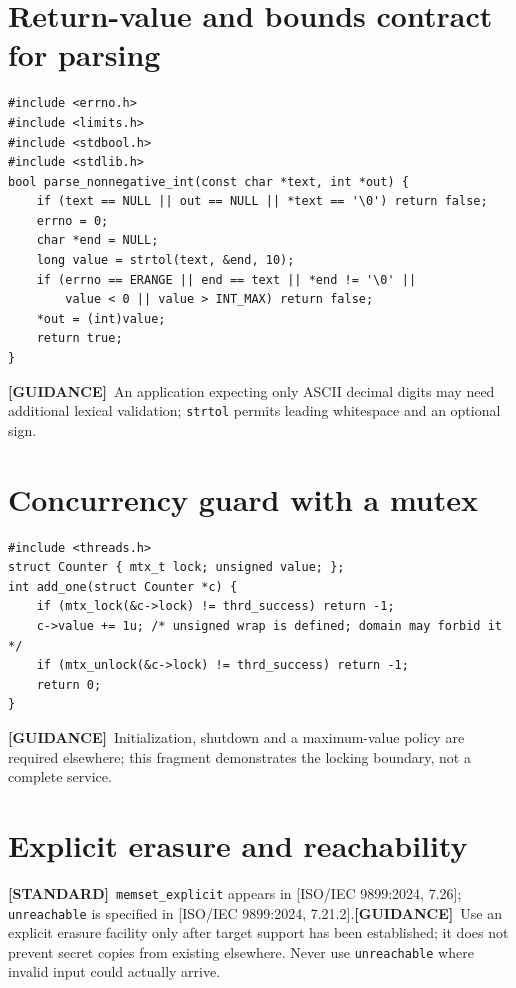 \documentclass[10pt,letterpaper,oneside]{report}
\newcommand{\refcl}[1]{\textsf{\footnotesize[ISO/IEC 9899:2024, #1]}}
\newcommand{\standard}{\textbf{[STANDARD]}}
\newcommand{\guidance}{\textbf{[GUIDANCE]}}
\begin{document}
\section{Return-value and bounds contract for parsing}
\begin{lstlisting}
#include <errno.h>
#include <limits.h>
#include <stdbool.h>
#include <stdlib.h>
bool parse_nonnegative_int(const char *text, int *out) {
    if (text == NULL || out == NULL || *text == '\0') return false;
    errno = 0;
    char *end = NULL;
    long value = strtol(text, &end, 10);
    if (errno == ERANGE || end == text || *end != '\0' ||
        value < 0 || value > INT_MAX) return false;
    *out = (int)value;
    return true;
}
\end{lstlisting}
\guidance\ An application expecting only ASCII decimal digits may need additional lexical validation; \texttt{strtol} permits leading whitespace and an optional sign.
\section{Concurrency guard with a mutex}
\begin{lstlisting}
#include <threads.h>
struct Counter { mtx_t lock; unsigned value; };
int add_one(struct Counter *c) {
    if (mtx_lock(&c->lock) != thrd_success) return -1;
    c->value += 1u; /* unsigned wrap is defined; domain may forbid it */
    if (mtx_unlock(&c->lock) != thrd_success) return -1;
    return 0;
}
\end{lstlisting}
\guidance\ Initialization, shutdown and a maximum-value policy are required elsewhere; this fragment demonstrates the locking boundary, not a complete service.
\section{Explicit erasure and reachability}
\standard\ \texttt{memset\_explicit} appears in \refcl{7.26}; \texttt{unreachable} is specified in \refcl{7.21.2}.\guidance\ Use an explicit erasure facility only after target support has been established; it does not prevent secret copies from existing elsewhere. Never use \texttt{unreachable} where invalid input could actually arrive.
\end{document}
